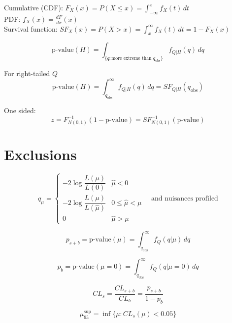 \documentclass{article}
\begin{document}
Cumulative (CDF): $F_X(x) = P(X\leq x) = \int_{-\infty}^x f_X(t)\,dt$\\
PDF: $f_X(x) = \frac{dF}{dx}(x)$ \\
Survival function: $SF_X(x) = P(X>x) = \int_x^\infty f_X(t)\, dt = 1 - F_X(x)$


\[
  \text{p-value}(H) = \int_{\{q:\text{more extreme than } q_\text{obs}\}} f_{Q|H}(q)\,dq
\]

For right-tailed $Q$
\[
  \text{p-value}(H) = \int_{q_\text{obs}}^{\infty} f_{Q|H}(q)\, dq = SF_{Q|H}(q_\text{obs})
\]

One sided:
\[
z = F^{-1}_{N(0,1)}(1 - \text{p-value}) = SF^{-1}_{N(0,1)}(\text{p-value})
\]

\section{Exclusions}

\begin{equation*}
q_\mu = \begin{cases}
  -2\log \dfrac{L(\mu)}{L(0)} & \hat{\mu} < 0 \\
  -2\log \dfrac{L(\mu)}{L(\hat{\mu})} & 0\leq \hat\mu < \mu \\
  0 & \hat\mu > \mu
  \end{cases}\quad\text{and nuisances profiled}
\end{equation*}


\[
p_{s+b} = \text{p-value}(\mu) = \int_{q_\text{obs}}^\infty f_Q(q | \mu)\,dq
\]

\[
p_b = \text{p-value}(\mu=0) = \int_{q_\text{obs}}^\infty f_Q(q | \mu=0)\,dq
\]

\[
CL_s = \frac{CL_{s+b}}{CL_{b}} = \frac{p_{s+b}}{1 - p_b}
\]

\[
\mu_{95}^\text{sup} = \inf\{\mu:CL_s(\mu) < 0.05\}
\]
\end{document}
